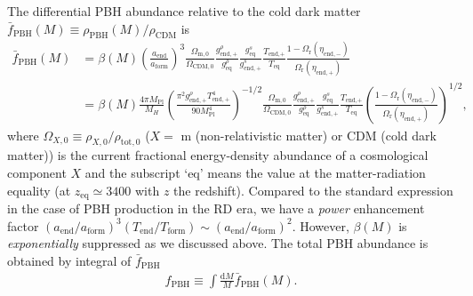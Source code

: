 \documentclass[superscriptaddress, aps, preprintnumbers,
amsmath, amssymb, sort&compress, nofootinbib, 10pt, paper, floatfix]{revtex4-2}
\newcommand{\Pl}{\text{Pl}}
\newcommand{\en}{{\text{end}}}
\newcommand{\eq}{{\text{eq}}}
\begin{document}
The differential PBH abundance relative to the cold dark matter $\bar{f}_\text{PBH}(M) \equiv \rho_\text{PBH}(M) / \rho_\text{CDM}$ is
\begin{align}
    \bar{f}_\text{PBH}(M) &= \beta(M)  \left( \frac{a_\text{end}}{a_\text{form}} \right)^3 \frac{\Omega_{\text{m},0}}{\Omega_{\text{CDM},0}} \frac{g^\rho _{\en,+}}{g^\rho_\eq} \frac{g^s_\eq}{g^s_{\en,+}} \frac{T_\text{end,+}}{T_\text{eq}} \frac{1-\Omega_\text{r}(\eta_{\text{end},-})}{\Omega_\text{r}(\eta_{\text{end},+})} \nonumber \\
    &= \beta(M)  \frac{4\pi M_\Pl}{M_H} \left(\frac{\pi^2 g^\rho_{\en,+} T_{\en,+}^4}{90 M_\Pl^4} \right)^{-1/2} \frac{\Omega_{\text{m},0}}{\Omega_{\text{CDM},0}} \frac{g^\rho _{\en,+}}{g^\rho_\eq} \frac{g^s_\eq}{g^s_{\en,+}} \frac{T_\text{end,+}}{T_\text{eq}} \left(\frac{1-\Omega_\text{r}(\eta_{\text{end},-})}{\Omega_\text{r}(\eta_{\text{end},+})}\right)^{1/2},
\end{align}
where $\Omega_{X,0} \equiv \rho_{X,0} / \rho_{\text{tot},0}$ ($X=$ m (non-relativistic matter) or CDM (cold dark matter)) is the current fractional energy-density abundance of a cosmological component $X$ and the subscript `eq' means the value at the matter-radiation equality (at $z_\eq\simeq 3400$ with $z$ the redshift).
Compared to the standard expression in the case of PBH production in the RD era, we have a \emph{power} enhancement factor $(a_\text{end}/a_\text{form})^3 (T_\text{end}/T_\text{form}) \sim (a_\text{end}/a_\text{form})^2$.  However, $\beta(M)$ is \emph{exponentially} suppressed as we discussed above.  The total PBH abundance is obtained by integral of $\bar{f}_\text{PBH}$
\begin{align}
    f_\text{PBH} \equiv \int \frac{\mathrm{d}M}{M} \bar{f}_\text{PBH}(M).
\end{align}
\end{document}

